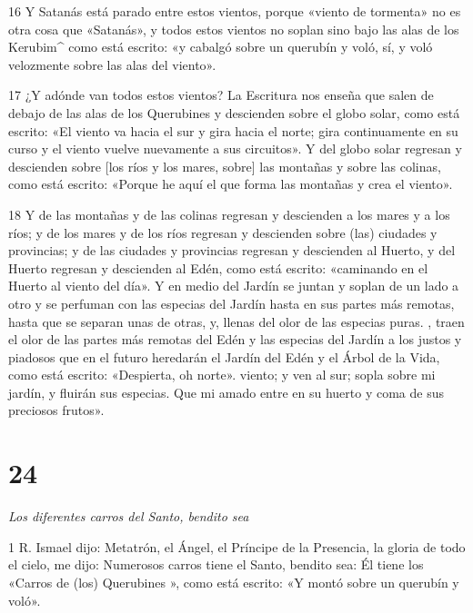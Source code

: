\par 16 Y Satanás está parado entre estos vientos, porque «viento de tormenta» no es otra cosa que «Satanás», y todos estos vientos no soplan sino bajo las alas de los Kerubim^ como está escrito: «y cabalgó sobre un querubín y voló, sí, y voló velozmente sobre las alas del viento».

\par 17 ¿Y adónde van todos estos vientos? La Escritura nos enseña que salen de debajo de las alas de los Querubines y descienden sobre el globo solar, como está escrito: «El viento va hacia el sur y gira hacia el norte; gira continuamente en su curso y el viento vuelve nuevamente a sus circuitos». Y del globo solar regresan y descienden sobre [los ríos y los mares, sobre] las montañas y sobre las colinas, como está escrito: «Porque he aquí el que forma las montañas y crea el viento».

\par 18 Y de las montañas y de las colinas regresan y descienden a los mares y a los ríos; y de los mares y de los ríos regresan y descienden sobre (las) ciudades y provincias; y de las ciudades y provincias regresan y descienden al Huerto, y del Huerto regresan y descienden al Edén, como está escrito: «caminando en el Huerto al viento del día». Y en medio del Jardín se juntan y soplan de un lado a otro y se perfuman con las especias del Jardín hasta en sus partes más remotas, hasta que se separan unas de otras, y, llenas del olor de las especias puras. , traen el olor de las partes más remotas del Edén y las especias del Jardín a los justos y piadosos que en el futuro heredarán el Jardín del Edén y el Árbol de la Vida, como está escrito: «Despierta, oh norte». viento; y ven al sur; sopla sobre mi jardín, y fluirán sus especias. Que mi amado entre en su huerto y coma de sus preciosos frutos».

\chapter{24}

\par \textit{Los diferentes carros del Santo, bendito sea}

\par 1 R. Ismael dijo: Metatrón, el Ángel, el Príncipe de la Presencia, la gloria de todo el cielo, me dijo: Numerosos carros tiene el Santo, bendito sea: Él tiene los «Carros de (los) Querubines », como está escrito: «Y montó sobre un querubín y voló».

